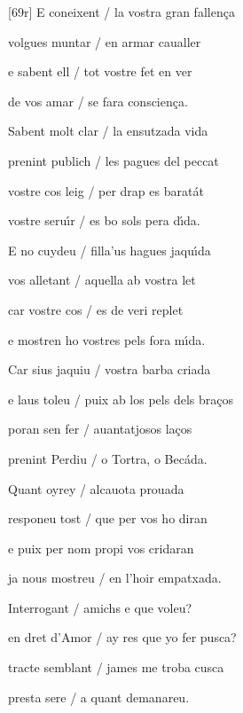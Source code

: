 \documentclass[12pt]{article}
\begin{document}
\begin{estrofa}

 [69r] E coneixent / la vostra gran fallen\c{c}a

 volgues muntar / en armar caualler

 e sabent ell / tot vostre fet en ver

 de vos amar / se fara conscien\c{c}a.

 Sabent molt clar / la ensutzada vida

 prenint publich / les pagues del peccat

 vostre cos leig / per drap es barat\'{a}t

 vostre seru\'{\i}r / es bo sols pera d\'{\i}da.

\end{estrofa}



\begin{estrofa}

 E no cuydeu / filla'us hagues jaqu\'{\i}da

 vos alletant / aquella ab vostra let

 car vostre cos / es de veri replet

 e mostren ho vostres pels fora m\'{\i}da.

 Car sius jaquiu / vostra barba criada

 e laus toleu / puix ab los pels dels bra\c{c}os

 poran sen fer / auantatjosos la\c{c}os

 prenint Perdiu / o Tortra, o Bec\'{a}da.

\end{estrofa}



\begin{estrofa}

 Quant oyrey / alcauota prouada

 responeu tost / que per vos ho diran

 e puix per nom propi vos cridaran

 ja nous mostreu / en l'hoir empatxada.

 Interrogant / amichs e que voleu?

 en dret d'Amor / ay res que yo fer pusca?

 tracte semblant / james me troba cusca

 presta sere / a quant demanareu.

\end{estrofa}
\end{document}

